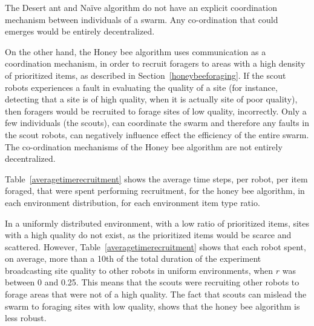 
The Desert ant and Na\"ive algorithm do not have an explicit coordination mechanism between individuals of a swarm. Any co-ordination that could emerges would be entirely decentralized. 

On the other hand, the Honey bee algorithm uses communication as a coordination mechanism, in order to recruit foragers to areas with a high density of prioritized items, as described in Section~\ref{honeybeeforaging}. If the scout robots experiences a fault in evaluating the quality of a site (for instance, detecting that a site is of high quality, when it is actually site of poor quality), then foragers would be recruited to forage sites of low quality, incorrectly. Only a few individuals (the scouts), can coordinate the swarm and therefore any faults in the scout robots, can negatively influence effect the efficiency of the entire swarm. The co-ordination mechanisms of the Honey bee algorithm are not entirely decentralized.

Table~\ref{averagetimerecruitment} shows the average time steps, per robot, per item foraged, that were spent performing recruitment, for the honey bee algorithm, in each environment distribution, for each environment item type ratio. 

In a uniformly distributed environment, with a low ratio of prioritized items, sites with a high quality do not exist, as the prioritized items would be scarce and scattered. However, Table~\ref{averagetimerecruitment} shows that each robot spent, on average, more than a 10th of the total duration of the experiment broadcasting site quality to other robots in uniform environments, when $r$ was between 0 and 0.25. This means that the scouts were recruiting other robots to forage areas that were not of a high quality. The fact that scouts can mislead the swarm to foraging sites with low quality, shows that the honey bee algorithm is less robust.

